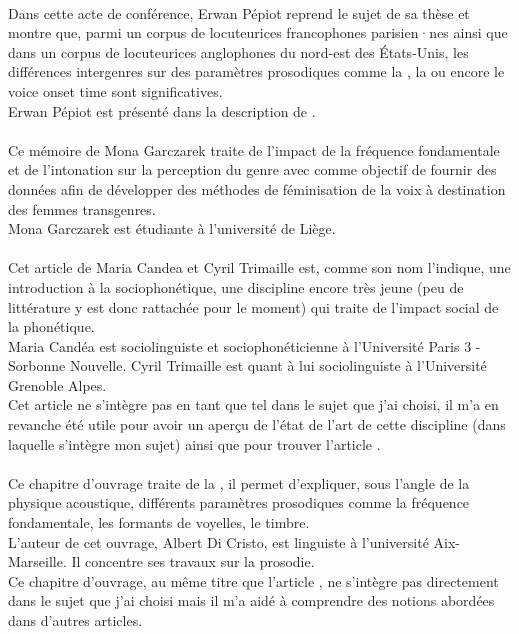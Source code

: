 \parencite{Pep16} \\
      Dans cette acte de conférence, Erwan Pépiot reprend le sujet de sa thèse et montre que, parmi un corpus de locuteurices francophones parisien·nes ainsi que dans un corpus de locuteurices anglophones du nord-est des États-Unis, les différences intergenres sur des paramètres prosodiques comme la , la  ou encore le voice onset time sont significatives.\\
      Erwan Pépiot est présenté dans la description de \parencite{Pep20}.\\

\parencite{Gar22}\\
      Ce mémoire de Mona Garczarek traite de l'impact de la fréquence fondamentale et de l'intonation sur la perception du genre avec comme objectif de fournir des données afin de développer des méthodes de féminisation de la voix à destination des femmes transgenres.\\
      Mona Garczarek est étudiante à l'université de Liège.\\

\parencite{Can15} \\
      Cet article de Maria Candea et Cyril Trimaille est, comme son nom l'indique, une introduction à la sociophonétique, une discipline encore très jeune (peu de littérature y est donc rattachée pour le moment) qui traite de l'impact social de la phonétique.\\
      Maria Candéa est sociolinguiste et sociophonéticienne à l'Université Paris 3 - Sorbonne Nouvelle. Cyril Trimaille est quant à lui sociolinguiste à l'Université Grenoble Alpes.\\
      Cet article ne s'intègre pas en tant que tel dans le sujet que j'ai choisi, il m'a en revanche été utile pour avoir un aperçu de l'état de l'art de cette discipline (dans laquelle s'intègre mon sujet) ainsi que pour trouver l'article \parencite{Pep20}.\\
      
\parencite{DiC13}\\
      Ce chapitre d'ouvrage traite de la , il permet d'expliquer, sous l'angle de la physique acoustique, différents paramètres prosodiques comme la fréquence fondamentale, les formants de voyelles, le timbre.\\
      L'auteur de cet ouvrage, Albert Di Cristo, est linguiste à l'université Aix-Marseille. Il concentre ses travaux sur la prosodie.\\
      Ce chapitre d'ouvrage, au même titre que l'article \parencite{Can15}, ne s'intègre pas directement dans le sujet que j'ai choisi mais il m'a aidé à comprendre des notions abordées dans d'autres articles.\\

\printbibliography
